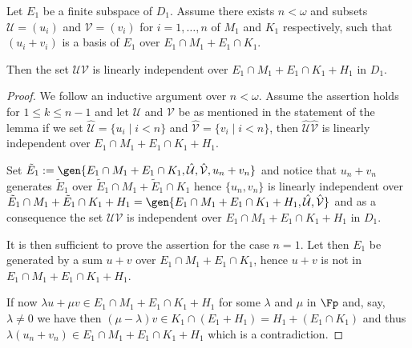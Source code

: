 \begin{lem}\label{basee}
Let $E_{1}$ be a finite subspace of $D_{1}$. Assume there exists $n<\omega$ and subsets $\mathcal{U}=(u_{i})$ and $\mathcal{V}=(v_{i})$ for $i=1,\dots,n$ of $M_{1}$ and $K_{1}$ respectively,
such that $(u_{i}+v_{i})$ is a basis of $E_{1}$ over $E_{1}\cap M_{1}+E_{1}\cap K_{1}$.

Then the set $\mathcal{UV}$ is linearly independent over $E_{1}\cap M_{1}+E_{1}\cap K_{1}+H_{1}$ in $D_{1}$.
\end{lem}
\begin{proof}
We follow an inductive argument over $n<\omega$. Assume the assertion holds for $1\leq k\leq n-1$ and
let $\mathcal{U}$ and $\mathcal{V}$ be as mentioned in the statement of the lemma
if we set $\hat{\mathcal{U}}=\{u_{i}\mid i<n\}$ and $\hat{\mathcal{V}}=\{v_{i}\mid i<n\}$, then
$\hat{\mathcal{U}}\hat{\mathcal{V}}$ is linearly independent over $E_{1}\cap M_{1}+E_{1}\cap K_{1}+H_{1}$.

Set $\tilde{E}_{1}:=\gen{E_{1}\cap M_{1}+E_{1}\cap K_{1},\hat{\mathcal{U}},\hat{\mathcal{V}},u_{n}+v_{n}}$ and notice
that $u_{n}+v_{n}$ generates $\tilde{E}_{1}$ over $\tilde{E}_{1}\cap M_{1}+\tilde{E}_{1}\cap K_{1}$ hence
$\{u_{n},v_{n}\}$ is linearly independent over $\tilde{E}_{1}\cap M_{1}+\tilde{E}_{1}\cap K_{1}+H_{1}=
\gen{E_{1}\cap M_{1}+E_{1}\cap K_{1}+H_{1},\hat{\mathcal{U}},\hat{\mathcal{V}}}$ and as a consequence
the set $\mathcal{UV}$ is independent over $E_{1}\cap M_{1}+E_{1}\cap K_{1}+H_{1}$ in $D_{1}$.

\medskip
It is then sufficient to prove the assertion for the case $n=1$.
Let then $E_{1}$ be generated by a sum $u+v$ over
$E_{1}\cap M_{1}+E_{1}\cap K_{1}$, hence $u+v$ is not
in $E_{1}\cap M_{1}+E_{1}\cap K_{1}+H_{1}$.%

If now $\lambda u + \mu v \in E_{1}\cap M_{1}+E_{1}\cap K_{1}+H_{1}$ for some $\lambda$ and $\mu$ in $\Fp$ and,
say, $\lambda\neq0$ we have then $%
(\mu-\lambda)v\in K_{1}\cap (E_{1} +H_{1})=H_{1}+(E_{1}\cap K_{1})$ and thus $\lambda(u_{n}+v_{n})\in E_{1}\cap M_{1}+E_{1}\cap K_{1}+H_{1}$ which
is a contradiction.
\end{proof}

